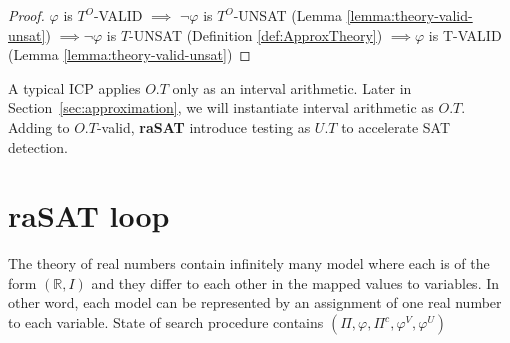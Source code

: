 \begin{proof}
$\varphi$ is $T^O$-VALID $\implies$ $\neg\varphi$ is $T^O$-UNSAT (Lemma \ref{lemma:theory-valid-unsat}) $\implies \neg\varphi$ is $T$-UNSAT (Definition \ref{def:ApproxTheory}) $\implies \varphi$ is T-VALID (Lemma \ref{lemma:theory-valid-unsat})
\end{proof}

A typical ICP applies $O.T$ only as an interval arithmetic. 
Later in Section~\ref{sec:approximation}, we will instantiate interval arithmetic as $O.T$. 
Adding to $O.T$-valid, {\bf raSAT} introduce testing as $U.T$ to accelerate SAT detection. 


\section{raSAT loop}
The theory of real numbers contain infinitely many model where each is of the form $(\mathbb{R}, I)$ and they differ to each other in the mapped values to variables. In other word, each model can be represented by an assignment of one real number to each variable. 
State of search procedure contains  $(\Pi, \varphi, \Pi^c, \varphi^V, \varphi^U)$


